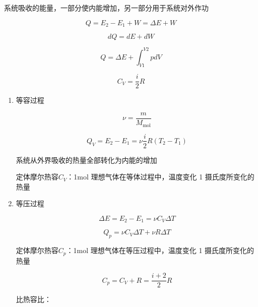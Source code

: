 系统吸收的能量，一部分使内能增加，另一部分用于系统对外作功

\begin{equation}
    Q=E_2-E_1+W=\Delta{}E+W
\end{equation}

\begin{equation}
    dQ=dE+dW
\end{equation}

\begin{equation}
    Q=\Delta{E}+\int_{V1}^{V2}{pdV}
\end{equation}

\begin{equation}
    C_V=\frac{i}{2}R
\end{equation}

\begin{enumerate}

    \item 等容过程

          \begin{equation}
              \nu{}=\frac{m}{M_\mathrm{mol}}
          \end{equation}

          \begin{equation}
              Q_V=E_2-E_1=\nu{}\frac{i}{2}R(T_2-T_1)
          \end{equation}

          系统从外界吸收的热量全部转化为内能的增加

          定体摩尔热容$C_V$：1mol 理想气体在等体过程中，温度变化 1 摄氏度所变化的热量

    \item 等压过程

          \begin{equation}
              \Delta{}E=E_2-E_1=\nu{}C_V\Delta{T}
          \end{equation}

          \begin{equation}
              Q_p=\nu{}C_V\Delta{T}+\nu{}R\Delta{T}
          \end{equation}

          定体摩尔热容$C_p$：1mol 理想气体在等压过程中，温度变化 1 摄氏度所变化的热量

          \begin{equation}
              C_p=C_V+R=\frac{i+2}{2}R
          \end{equation}

          比热容比：


\end{enumerate}
